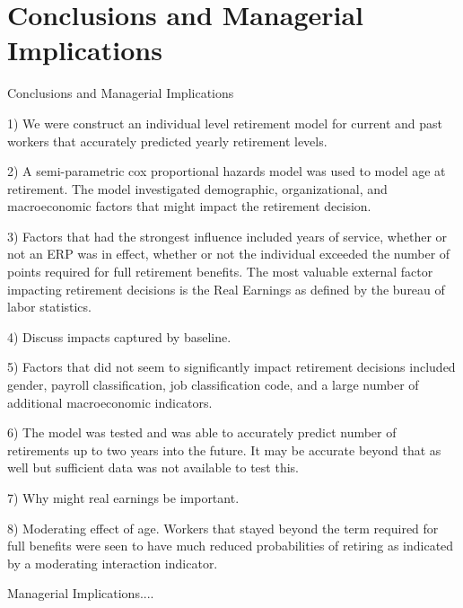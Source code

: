 \documentclass[12pt,letterpaper]{article}
\begin{document}
\section{Conclusions and Managerial Implications}
Conclusions and Managerial Implications

1) We were construct an individual level retirement model for current and past workers that accurately predicted yearly retirement levels.

2) A semi-parametric cox proportional hazards model was used to model age at retirement.  The model investigated demographic, organizational, and macroeconomic factors that might impact the retirement decision.

3) Factors that had the strongest influence included years of service, whether or not an ERP was in effect, whether or not the individual exceeded the number of points required for full retirement benefits.  The most valuable external factor impacting retirement decisions is the Real Earnings as defined by the bureau of labor statistics.

4) Discuss impacts captured by baseline.

5) Factors that did not seem to significantly impact retirement decisions included gender, payroll classification, job classification code, and a large number of additional macroeconomic indicators.

6) The model was tested and was able to accurately predict number of retirements up to two years into the future.  It may be accurate beyond that as well but sufficient data was not available to test this.

7) Why might real earnings be important.

8) Moderating effect of age.  Workers that stayed beyond the term required for full benefits were seen to have much reduced probabilities of retiring as indicated by a moderating interaction indicator.


Managerial Implications....

	
\end{document}
